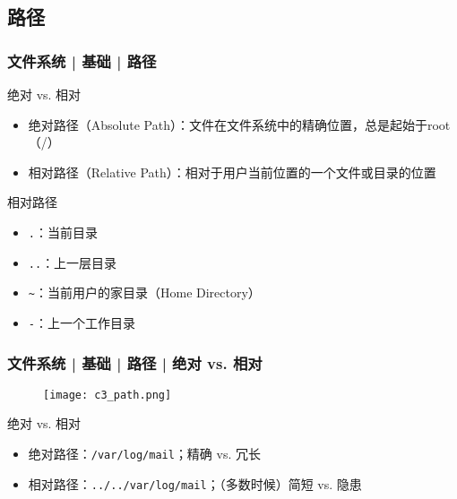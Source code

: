 \subsection{路径}
\begin{frame}[fragile]
  \frametitle{文件系统 | 基础 | \alert{路径}}
  \begin{block}{绝对 vs. 相对}
    \begin{itemize}
      \item 绝对路径（Absolute Path）：文件在文件系统中的精确位置，总是起始于root（/）
      \item 相对路径（Relative Path）：相对于用户当前位置的一个文件或目录的位置
    \end{itemize}
  \end{block}
  \pause
  \begin{block}{相对路径}
    \begin{itemize}
      \item \verb|.|：当前目录
      \item \verb|..|：上一层目录
      \item \verb|~|：当前用户的家目录（Home Directory）
      \item \verb|-|：上一个工作目录
    \end{itemize}
  \end{block}
\end{frame}

\begin{frame}[fragile]
  \frametitle{文件系统 | 基础 | 路径 | 绝对 vs. 相对}
  \begin{figure}
    \centering
    \texttt{[image: c3\_path.png]}
  \end{figure}
  \pause
  \begin{block}{绝对 vs. 相对}
    \begin{itemize}[<+->]
      \item 绝对路径：\verb|/var/log/mail|；精确 vs. 冗长
      \item 相对路径：\verb|../../var/log/mail|；（多数时候）简短 vs. 隐患
    \end{itemize}
  \end{block}
\end{frame}

